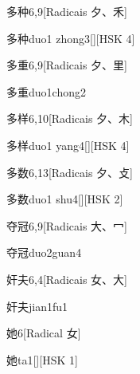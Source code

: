 \begin{entry}{多种}{6,9}[Radicais ⼣、⽲]
  \begin{phonetics}{多种}{duo1 zhong3}[][HSK 4]
  \end{phonetics}
\end{entry}

\begin{entry}{多重}{6,9}[Radicais ⼣、⾥]
  \begin{phonetics}{多重}{duo1chong2}
  \end{phonetics}
\end{entry}

\begin{entry}{多样}{6,10}[Radicais ⼣、⽊]
  \begin{phonetics}{多样}{duo1 yang4}[][HSK 4]
  \end{phonetics}
\end{entry}

\begin{entry}{多数}{6,13}[Radicais ⼣、⽁]
  \begin{phonetics}{多数}{duo1 shu4}[][HSK 2]
  \end{phonetics}
\end{entry}

\begin{entry}{夺冠}{6,9}[Radicais ⼤、⼍]
  \begin{phonetics}{夺冠}{duo2guan4}
  \end{phonetics}
\end{entry}

\begin{entry}{奸夫}{6,4}[Radicais ⼥、⼤]
  \begin{phonetics}{奸夫}{jian1fu1}
  \end{phonetics}
\end{entry}

\begin{entry}{她}{6}[Radical ⼥]
  \begin{phonetics}{她}{ta1}[][HSK 1]
  \end{phonetics}
\end{entry}

